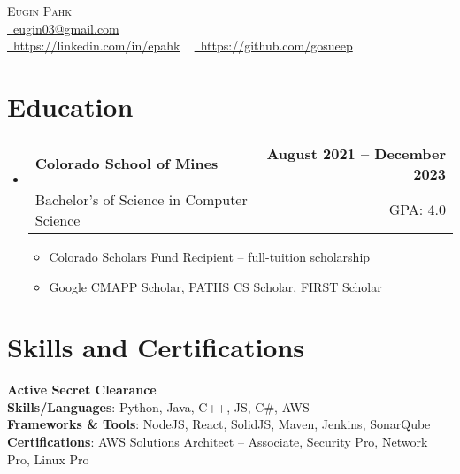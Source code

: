 \documentclass[11pt, letterpaper]{article}
\makeatletter
\newcommand{\resumeItem}[1]{
  \item\small{
    {#1 \vspace{-2pt}}
  }
}
\newcommand{\resumeSubheading}[4]{
  \vspace{-2pt}\item
    \begin{tabular*}{1.0\textwidth}[t]{l@{\extracolsep{\fill}}r}
      \textbf{#1} & \textbf{\small #2} \\
      {\small#3} & {\small #4} \\
    \end{tabular*}\vspace{-7pt}
}
\newcommand{\resumeSubHeadingListStart}{\begin{itemize}[leftmargin=0.0in, label={}]}
\newcommand{\resumeSubHeadingListEnd}{\end{itemize}}
\newcommand{\resumeItemListStart}{\begin{itemize}}
\newcommand{\resumeItemListEnd}{\end{itemize}\vspace{-5pt}}
\makeatother
\begin{document}
\begin{center}
    {
    \huge \scshape Eugin Pahk} \\ \vspace{4pt}
    \small
    \href{mailto:eugin03@gmail.com}{\faEnvelope\ eugin03@gmail.com} ~ \\
    \vspace{2pt}
    \href{https://linkedin.com/in/epahk}{\faLinkedin\ https://linkedin.com/in/epahk}  ~
    \href{https://github.com/gosueep}{\faGithub\ https://github.com/gosueep}
    \vspace{-5pt}
\end{center}




\section{Education}   %
  \resumeSubHeadingListStart
    \resumeSubheading
      {Colorado School of Mines}{August 2021 -- December 2023}
      {Bachelor's of Science in Computer Science }{GPA: 4.0}
      \resumeItemListStart
        \resumeItem{Colorado Scholars Fund Recipient -- full-tuition scholarship}
        \resumeItem{Google CMAPP Scholar, PATHS CS Scholar, FIRST Scholar}
      \resumeItemListEnd
    \resumeSubHeadingListEnd

\section{Skills and Certifications}   %
 \begin{itemize}[leftmargin=0.1in, label={}]
    \small{\item{
      \textbf{Active Secret Clearance}\\
      \textbf{Skills/Languages}{: Python, Java, C++, JS, C\#, AWS} \\
      \textbf{Frameworks \& Tools}{: NodeJS, React, SolidJS, Maven, Jenkins, SonarQube} \\
      \textbf{Certifications}{: AWS Solutions Architect -- Associate, Security Pro, Network Pro, Linux Pro}\\
    }}
 \end{itemize}
\end{document}

